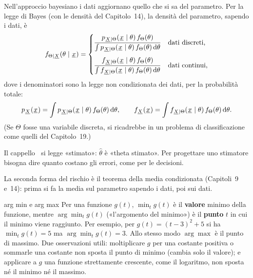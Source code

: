Nell'approccio bayesiano i dati aggiornano quello che si sa del parametro. Per la legge di Bayes (con le densità del
Capitolo~14), la densità  del parametro, sapendo i dati, è
\[ f_{\Theta \mid {\mkern1mu\underline{X}\mkern1mu}}(\theta \mid {\mkern1mu\underline{x}\mkern1mu}) = \begin{cases} \dfrac{p_{{\mkern1mu\underline{X}\mkern1mu} \mid \Theta}({\mkern1mu\underline{x}\mkern1mu} \mid
   \theta)\, f_\Theta(\theta)}{\int p_{{\mkern1mu\underline{X}\mkern1mu} \mid \Theta}({\mkern1mu\underline{x}\mkern1mu} \mid \theta)\, f_\Theta(\theta) \,\mathrm{d}\theta} &
   \text{dati discreti,} \\[5mm] \dfrac{f_{{\mkern1mu\underline{X}\mkern1mu} \mid \Theta}({\mkern1mu\underline{x}\mkern1mu} \mid \theta)\, f_\Theta(\theta)}{\int
   f_{{\mkern1mu\underline{X}\mkern1mu} \mid \Theta}({\mkern1mu\underline{x}\mkern1mu} \mid \theta)\, f_\Theta(\theta) \,\mathrm{d}\theta} & \text{dati continui,} \end{cases} \]
dove i denominatori sono la legge non condizionata dei dati, per la probabilità totale:
\[ p_{{\mkern1mu\underline{X}\mkern1mu}}({\mkern1mu\underline{x}\mkern1mu}) = \int p_{{\mkern1mu\underline{X}\mkern1mu} \mid \Theta}({\mkern1mu\underline{x}\mkern1mu} \mid \theta)\, f_\Theta(\theta) \,\mathrm{d}\theta , \qquad
   f_{{\mkern1mu\underline{X}\mkern1mu}}({\mkern1mu\underline{x}\mkern1mu}) = \int f_{{\mkern1mu\underline{X}\mkern1mu} \mid \Theta}({\mkern1mu\underline{x}\mkern1mu} \mid \theta)\, f_\Theta(\theta) \,\mathrm{d}\theta . \]
(Se $\Theta$ fosse una variabile discreta, si ricadrebbe in un problema di classificazione come quelli del
Capitolo~19.)


Il cappello $\hat{\ }$ si legge «stimato»: $\hat\theta$ è «theta stimato». Per progettare uno stimatore bisogna dire
quanto costano gli errori, come per le decisioni.


La seconda forma del rischio è il teorema della media condizionata (Capitoli~9 e~14): prima si fa la media sul
parametro sapendo i dati, poi sui dati.

\begin{richiamo}{arg min e arg max}
Per una funzione $g(t)$, $\min_t g(t)$ è il \textbf{valore} minimo della funzione, mentre $\arg\min_t g(t)$
(«l'argomento del minimo») è il \textbf{punto} $t$ in cui il minimo viene raggiunto. Per esempio, per $g(t) = (t -
3)^2 + 5$ si ha $\min_t g(t) = 5$ ma $\arg\min_t g(t) = 3$. Allo stesso modo $\arg\max$ è il punto di massimo. Due
osservazioni utili: moltiplicare $g$ per una costante positiva o sommarle una costante non sposta il punto di minimo
(cambia solo il valore); e applicare a $g$ una funzione strettamente crescente, come il logaritmo, non sposta né il
minimo né il massimo.
\end{richiamo}

